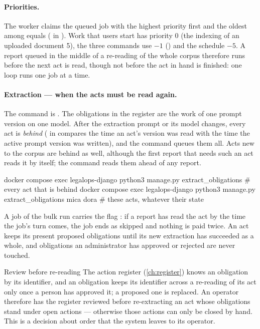 \paragraph{Priorities.} The worker claims the queued job with the highest priority first and
the oldest among equals ( in ). Work that users start has
priority 0 (the indexing of an uploaded document 5), the three commands use $-1$ () and the schedule $-5$. A report
queued in the middle of a re-reading of the whole corpus therefore runs before the next act
is read, though not before the act in hand is finished: one loop runs one job at a time.

\paragraph{Extraction --- when the acts must be read again.} The command is . The obligations
in the register are the work of one prompt version on one model. After the extraction prompt
or its model changes, every act is \emph{behind} ( in
 compares the time an act's version was read with the time the
active prompt version was written), and the command queues them all. Acts new to the corpus
are behind as well, although the first report that needs such an act reads it by itself; the
command reads them ahead of any report.

\begin{codeblock}
docker compose exec legalops-django python3 manage.py extract_obligations             # every act that is behind
docker compose exec legalops-django python3 manage.py extract_obligations mica dora   # these acts, whatever their state
\end{codeblock}

A job of the bulk run carries the flag : if a report has read the act by the
time the job's turn comes, the job ends as skipped and nothing is paid twice. An act keeps
its present proposed obligations until its new extraction has succeeded as a whole, and
obligations an administrator has approved or rejected are never touched.

\begin{humanbox}{Review before re-reading}
The action register (\cref{ch:register}) knows an obligation by its identifier, and an
obligation keeps its identifier across a re-reading of its act only once a person has
approved it; a proposed one is replaced. An operator therefore has the register reviewed
before re-extracting an act whose obligations stand under open actions --- otherwise those
actions can only be closed by hand. This is a decision about order that the system leaves to
its operator.
\end{humanbox}

